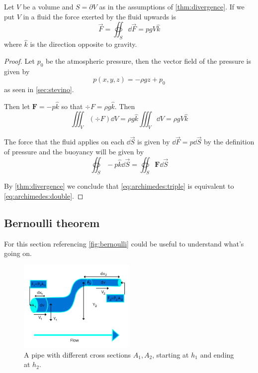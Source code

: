 \documentclass[12pt]{extarticle}
\begin{document}
\begin{theorem}
    Let $V$ be a volume and $S = \partial V$ as in the assumptions of \autoref{thm:divergence}.
    If we put $V$ in a fluid the force exerted by the fluid upwards is
    \begin{equation}
        \vec F = \oiint_S \dd{\vec F} = pgV \hat k
    \end{equation}
    where $\hat k$ is the direction opposite to gravity.
\end{theorem}

\begin{proof}
    Let $p_0$ be the atmospheric pressure, then the vector field of the pressure is given by
    \begin{equation}
        p(x, y, z) = - \rho g z + p_0
    \end{equation}
    as seen in \autoref{sec:stevino}.

    Then let $\bm{F} = -p \hat k$ so that $\div F = \rho g \hat k$.
    Then
    \begin{equation}
        \label{eq:archimedes:triple}
        \iiint_V (\div F) \dd{V} = \rho g \hat k \iiint_V \dd{V} = \rho g V \hat k
    \end{equation}

    The force that the fluid applies on each $\dd{\vec S}$ is given by $\dd{\vec F} = p \dd{\vec S}$ by the definition of pressure
    and the buoyancy will be given by
    \begin{equation}
        \label{eq:archimedes:double}
        \oiint_S - p \hat k \dd{\vec S} = \oiint_S \bm{F} \dd{\vec S}
    \end{equation}

    By \autoref{thm:divergence} we conclude that \autoref{eq:archimedes:triple} is equivalent to \autoref{eq:archimedes:double}.
\end{proof}

\subsection{Bernoulli theorem}

For this section referencing \autoref{fig:bernoulli} could be useful to understand what's going on.

\begin{figure}
    \centering
    \includegraphics[width=0.5\textwidth]{assets/S2_P2_PHY1/bernoulli.png}
    \caption{A pipe with different cross sections $A_1, A_2$, starting at $h_1$ and ending at $h_2$.}
    \label{fig:bernoulli}
\end{figure}
\end{document}
